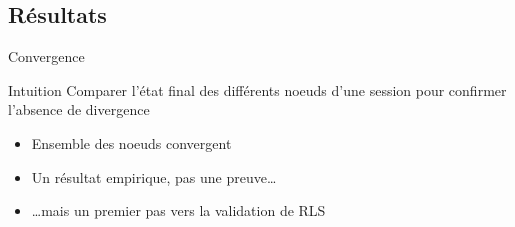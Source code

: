 \subsection{Résultats}

\begin{frame}{Convergence}
  \begin{block}{Intuition}
    Comparer l'état final des différents noeuds d'une session pour confirmer l'absence de divergence
  \end{block}
  \pause
  \begin{itemize}
    \item Ensemble des noeuds convergent
    \pause
    \item Un résultat empirique, pas une preuve\dots
    \item \dots mais un premier pas vers la validation de RLS
  \end{itemize}
\end{frame}

